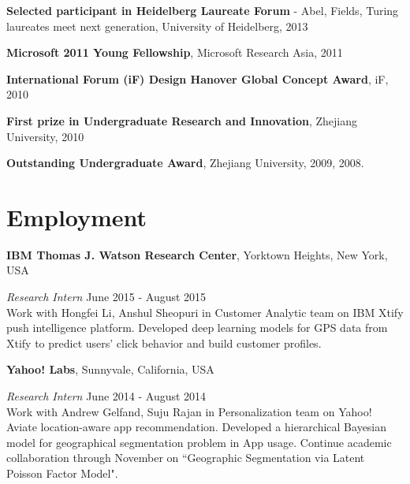 \documentclass[margin,line]{res}
\begin{document}
\begin{resume}


%

\textbf{Selected participant in Heidelberg Laureate Forum }- Abel, Fields, Turing laureates meet next generation, University of Heidelberg, 2013


\textbf{Microsoft 2011 Young Fellowship}, Microsoft Research Asia, 2011


\textbf{International Forum (iF) Design Hanover Global Concept Award}, iF, 2010 

\textbf{First prize in Undergraduate Research and Innovation}, Zhejiang University, 2010   

\textbf{Outstanding Undergraduate Award}, Zhejiang University, 2009, 2008. 

\section{\sc Employment} 
{\bf  IBM Thomas J. Watson Research Center}, Yorktown Heights, New York, USA

\vspace{-.3cm}
{\em Research Intern} \hfill {June 2015 - August 2015}\\ %
Work with Hongfei Li, Anshul Sheopuri in Customer Analytic team on IBM Xtify push intelligence platform. Developed deep learning models for GPS data from Xtify to predict users' click behavior and build customer profiles. 


{\bf  Yahoo! Labs}, Sunnyvale, California, USA

\vspace{-.3cm}
{\em Research Intern} \hfill { June 2014 - August 2014}\\ %
Work with Andrew Gelfand, Suju Rajan in Personalization team on Yahoo! Aviate location-aware app recommendation. Developed a hierarchical Bayesian model for geographical segmentation problem in App usage. Continue academic collaboration through November on ``Geographic Segmentation via Latent Poisson Factor Model".




\end{resume}
\end{document}
